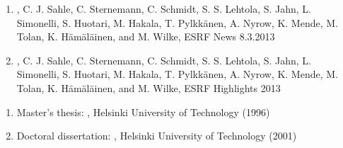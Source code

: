 \documentclass[12pt,a4]{report}
\begin{document}
\begin{enumerate}
\item {}, C. J. Sahle, C. Sternemann, C. Schmidt, S. S. Lehtola, S. Jahn, L. Simonelli, S. Huotari, M. Hakala, T. Pylkk{\"a}nen, A. Nyrow, K. Mende, M. Tolan, K. H{\"a}m{\"a}l{\"a}inen, and M. Wilke, ESRF News 8.3.2013

\item {}, C. J. Sahle, C. Sternemann, C. Schmidt, S. S. Lehtola, S. Jahn, L. Simonelli, S. Huotari, M. Hakala, T. Pylkk{\"a}nen, A. Nyrow, K. Mende, M. Tolan, K. H{\"a}m{\"a}l{\"a}inen, and M. Wilke, ESRF Highlights 2013

\end{enumerate}







\begin{enumerate}

\item Master's thesis: , Hel\-sin\-ki University of Technology (1996)

\item Doctoral dissertation: , Helsinki University of Technology (2001) 


\end{enumerate}

\end{document}
